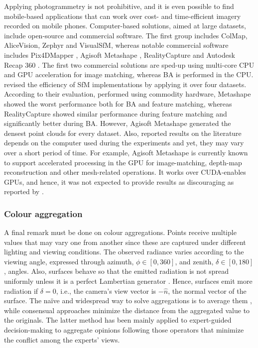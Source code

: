 Applying photogrammetry is not prohibitive, and it is even possible to find mobile-based applications that can work over cost- and time-efficient imagery recorded on mobile phones. Computer-based solutions, aimed at large datasets, include open-source and commercial software. The first group includes ColMap, AliceVision, Zephyr and VisualSfM, whereas notable commercial software includes Pix4DMapper \cite{zheng_thermal_2020}, Agisoft Metashape \cite{grechi_3d_2021}, RealityCapture and Autodesk Recap 360 \cite{lafi_3d_2017}. The first two commercial solutions are sped-up using multi-core CPU and GPU acceleration for image matching, whereas BA is performed in the CPU. \cite{jiang_efficient_2020} revised the efficiency of SfM implementations by applying it over four datasets. According to their evaluation, performed using commodity hardware, Metashape showed the worst performance both for BA and feature matching, whereas RealityCapture showed similar performance during feature matching and significantly better during BA. However, Agisoft Metashape generated the densest point clouds for every dataset. Also, reported results on the literature depends on the computer used during the experiments and yet, they may vary over a short period of time. For example, Agisoft Metashape is currently known to support accelerated processing in the GPU for image-matching, depth-map reconstruction and other mesh-related operations. It works over CUDA-enables GPUs, and hence, it was not expected to provide results as discouraging as reported by \cite{jiang_efficient_2020}.

\subsubsection{Colour aggregation}

A final remark must be done on colour aggregations. Points receive multiple values that may vary one from another since these are captured under different lighting and viewing conditions. The observed radiance varies according to the viewing angle, expressed through azimuth, $\phi \in [0, 360]$, and zenith, $\delta \in [0, 180]$, angles. Also, surfaces behave so that the emitted radiation is not spread uniformly unless it is a perfect Lambertian generator \cite{vollmer_infrared_2017}. Hence, surfaces emit more radiation if $\delta = 0$, i.e., the camera's view vector is $-\hat{n}$, the normal vector of the surface. The naïve and widespread way to solve aggregations is to average them \cite{javadnejad_photogrammetric_2020, hoegner_3d_2016}, while consensual approaches minimize the distance from the aggregated value to the originals. The latter method has been mainly applied to expert-guided decision-making to aggregate opinions following those operators that minimize the conflict among the experts' views.

